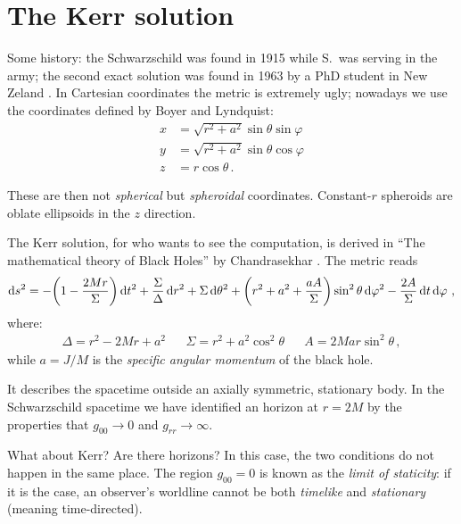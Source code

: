 \documentclass[main.tex]{subfiles}
\begin{document}
\section{The Kerr solution}


Some history: the Schwarzschild was found in 1915 while S.\ was serving in the army; the second exact solution was found in 1963 by a PhD student in New Zeland \cite[]{kerrGravitationalFieldSpinning1963}.
In Cartesian coordinates the metric is extremely ugly; nowadays we use the coordinates defined by Boyer and Lyndquist: 
%
\begin{align}
x &= \sqrt{r^2 + a^2} \sin \theta \sin \varphi   \\
y &= \sqrt{r^2 + a^2} \sin \theta \cos \varphi  \\
z &= r \cos \theta 
\,.
\end{align}

These are then not \emph{spherical} but \emph{spheroidal} coordinates. 
Constant-\(r\) spheroids are oblate ellipsoids in the \(z\) direction.

The Kerr solution, for who wants to see the computation, is derived in ``The mathematical theory of Black Holes'' by Chandrasekhar \cite[]{chandrasekharMathematicalTheoryBlack1998}.  
The metric reads 
%
\begin{align}
\dd{s^2} = - \qty(1 - \frac{2Mr}{\Sigma }) \dd{t^2}
+ \frac{\Sigma }{\Delta } \dd{r^2} 
+ \Sigma \dd{\theta ^2} 
+ \qty(r^2 + a^2 + \frac{aA}{\Sigma }) \sin^2 \theta \dd{\varphi^2} 
- \frac{2A}{\Sigma } \dd{t} \dd{\varphi }
\,,
\end{align}
%
where: 
%
\begin{align}
\Delta = r^2 - 2Mr + a^2
&&
\Sigma = r^2 + a^2 \cos^2 \theta 
&&
A = 2Mar \sin^2 \theta 
\,,
\end{align}
%
while \(a = J / M\) is the \emph{specific angular momentum} of the black hole. 

It describes the spacetime outside an axially symmetric, stationary body. 
In the Schwarzschild spacetime we have identified an horizon at \(r = 2M\) by the properties that \(g_{00} \to 0\) and \(g_{rr} \to \infty \). 

What about Kerr? Are there horizons? In this case, the two conditions do not happen in the same place. 
The region \(g_{00} = 0\) is known as the \emph{limit of staticity}: if it is the case, an observer's worldline cannot be both \emph{timelike} and \emph{stationary} (meaning time-directed). 
\end{document}
